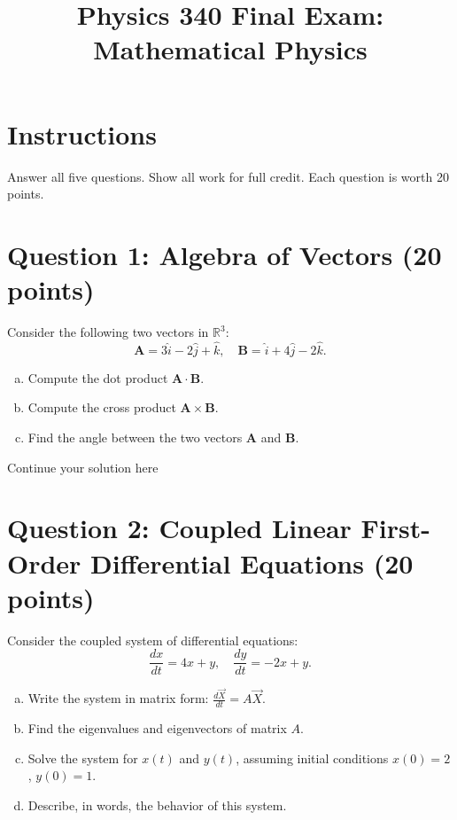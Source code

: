 \documentclass{article}
\begin{document}
\title{Physics 340 Final Exam: Mathematical Physics}
\author{}
\date{}
\maketitle

\section*{Instructions}
Answer all five questions. Show all work for full credit. Each question is worth 20 points.

\section*{Question 1: Algebra of Vectors (20 points)}

Consider the following two vectors in \( \mathbb{R}^3 \):
\[
\mathbf{A} = 3\hat{i} - 2\hat{j} + \hat{k}, \quad \mathbf{B} = \hat{i} + 4\hat{j} - 2\hat{k}.
\]
\begin{enumerate}[a)]
  \item Compute the dot product \( \mathbf{A} \cdot \mathbf{B} \).
  \item Compute the cross product \( \mathbf{A} \times \mathbf{B} \).
  \item Find the angle between the two vectors \( \mathbf{A} \) and \( \mathbf{B} \).
\end{enumerate}

\newpage
Continue your solution here
\vspace{4.0in}

\newpage

\section*{Question 2: Coupled Linear First-Order Differential Equations (20 points)}

Consider the coupled system of differential equations:
\[
\frac{dx}{dt} = 4x + y, \quad \frac{dy}{dt} = -2x + y.
\]
\begin{enumerate}[a)]
  \item Write the system in matrix form: \( \frac{d\vec{X}}{dt} = A \vec{X} \).
  \item Find the eigenvalues and eigenvectors of matrix \( A \).
  \item Solve the system for \( x(t) \) and \( y(t) \), assuming initial conditions \( x(0) = 2 \), \( y(0) = 1 \).
  \item Describe, in words, the behavior of this system.
\end{enumerate}
\end{document}
